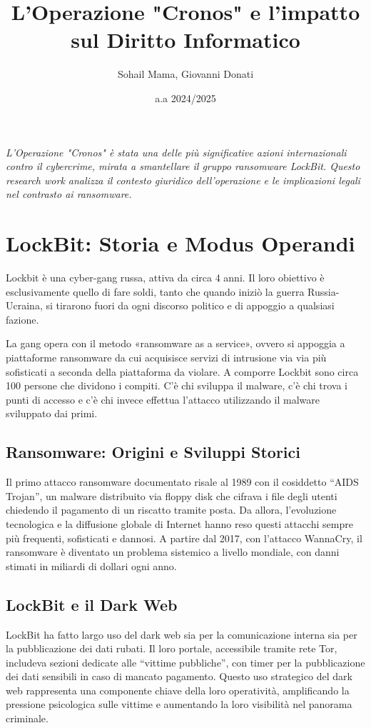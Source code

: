\documentclass[a4paper,12pt]{article}
\title{L'Operazione "Cronos" e l'impatto sul Diritto Informatico}
\author{Sohail Mama, Giovanni Donati}
\date{a.a 2024/2025}
\begin{document}
\maketitle

\vfill
\begin{center}
\textit{L'Operazione "Cronos" è stata una delle più significative azioni internazionali contro il cybercrime, mirata a smantellare il gruppo ransomware LockBit. Questo research work analizza il contesto giuridico dell'operazione e le implicazioni legali nel contrasto ai ransomware.}
\end{center}
\vfill

\newpage
\tableofcontents
\newpage

\section{LockBit: Storia e Modus Operandi}
Lockbit è una cyber-gang russa, attiva da circa 4 anni. Il loro obiettivo è esclusivamente quello di fare soldi, tanto che quando iniziò la guerra Russia-Ucraina, si tirarono fuori da ogni discorso politico e di appoggio a qualsiasi fazione.

La gang opera con il metodo «ransomware as a service», ovvero si appoggia a piattaforme ransomware da cui acquisisce servizi di intrusione via via più sofisticati a seconda della piattaforma da violare. A comporre Lockbit sono circa 100 persone che dividono i compiti. C’è chi sviluppa il malware, c’è chi trova i punti di accesso e c’è chi invece effettua l’attacco utilizzando il malware sviluppato dai primi.

\subsection{Ransomware: Origini e Sviluppi Storici}
Il primo attacco ransomware documentato risale al 1989 con il cosiddetto “AIDS Trojan”, un malware distribuito via floppy disk che cifrava i file degli utenti chiedendo il pagamento di un riscatto tramite posta. Da allora, l'evoluzione tecnologica e la diffusione globale di Internet hanno reso questi attacchi sempre più frequenti, sofisticati e dannosi. A partire dal 2017, con l'attacco WannaCry, il ransomware è diventato un problema sistemico a livello mondiale, con danni stimati in miliardi di dollari ogni anno.

\subsection{LockBit e il Dark Web}
LockBit ha fatto largo uso del dark web sia per la comunicazione interna sia per la pubblicazione dei dati rubati. Il loro portale, accessibile tramite rete Tor, includeva sezioni dedicate alle “vittime pubbliche”, con timer per la pubblicazione dei dati sensibili in caso di mancato pagamento. Questo uso strategico del dark web rappresenta una componente chiave della loro operatività, amplificando la pressione psicologica sulle vittime e aumentando la loro visibilità nel panorama criminale.
\end{document}
